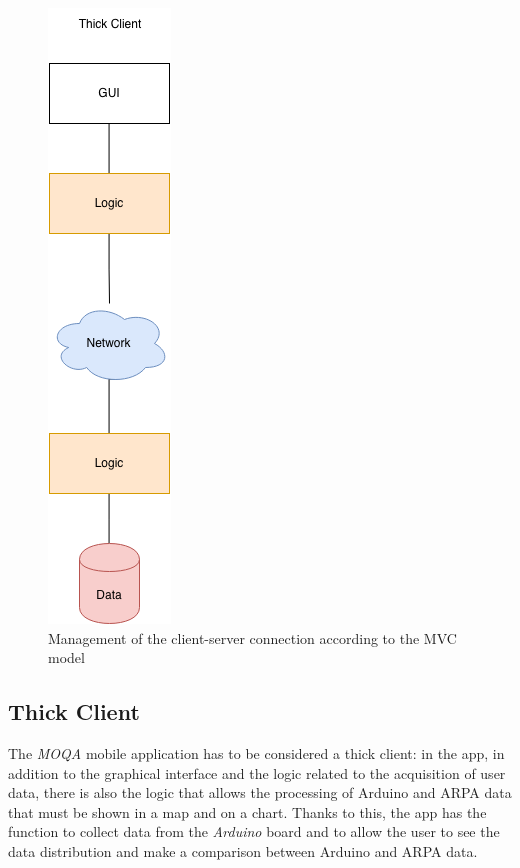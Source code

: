 \begin{figure}
  \begin{center}
    \includegraphics[height=.3\textheight]{./img/archi/mvc.png}
  \end{center}
  \caption{Management of the client-server connection according to the MVC model}
  \label{img:archi_mvc}
\end{figure}


\subsection{Thick Client}
The \textit{MOQA} mobile application has to be considered a thick client: in the app, in addition to the graphical interface and the logic related to the acquisition of user data, there is also the logic that allows the processing of Arduino and ARPA data that must be shown in a map and on a chart.
Thanks to this, the app has the function to collect data from the \textit{Arduino} board and to allow the user to see the data distribution and make a comparison between Arduino and ARPA data.

